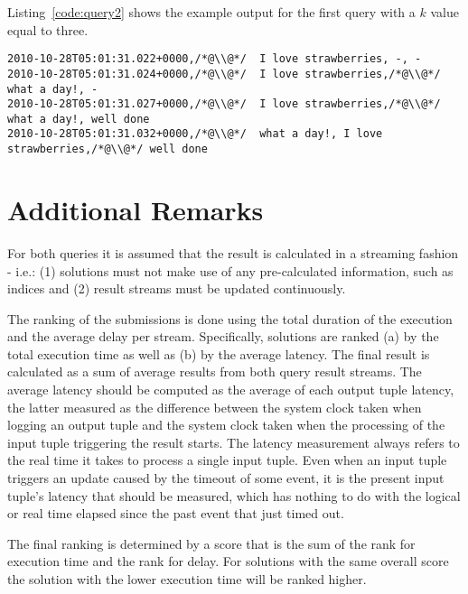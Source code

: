 \documentclass{sig-alternate}
\begin{document}
Listing~\ref{code:query2} shows the example output for the first query with a $k$ value equal to three. 

\begin{lstlisting}[float=ht,caption={Output example for the community interest query},label={code:query2}]
2010-10-28T05:01:31.022+0000,/*@\\@*/  I love strawberries, -, -
2010-10-28T05:01:31.024+0000,/*@\\@*/  I love strawberries,/*@\\@*/  what a day!, -
2010-10-28T05:01:31.027+0000,/*@\\@*/  I love strawberries,/*@\\@*/  what a day!, well done
2010-10-28T05:01:31.032+0000,/*@\\@*/  what a day!, I love strawberries,/*@\\@*/ well done
\end{lstlisting}

\section{Additional Remarks}
For both queries it is assumed that the result is calculated in a streaming fashion - i.e.: (1) solutions must not make use of any pre-calculated information, such as indices and (2) result streams must be updated continuously.

The ranking of the submissions is done using the total duration of the execution and the average delay per stream. Specifically, solutions are ranked (a) by the total execution time as well as (b) by the average latency. The final result is calculated as a sum of average results from both query result streams. The average latency should be computed as the average of each output tuple latency, the latter measured as the difference between the system clock taken when logging an output tuple and the system clock taken when the processing of the input tuple triggering the result starts. The latency measurement always refers to the real time it takes to process a single input tuple. Even when an input tuple triggers an update caused by the timeout of some event, it is the present input tuple's latency that should be measured, which has nothing to do with the logical or real time elapsed since the past event that just timed out.

The final ranking is determined by a score that is the sum of the rank for execution time and the rank for delay. For solutions with the same overall score the solution with the lower execution time will be ranked higher.
\end{document}
